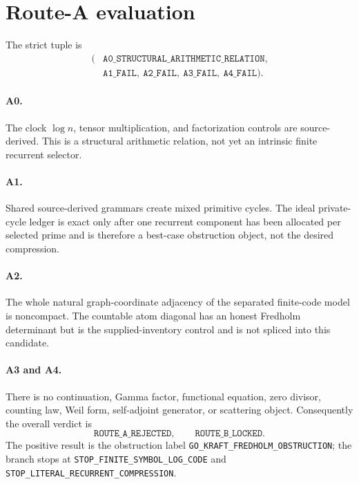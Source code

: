 \section{Route-A evaluation}

The strict tuple is
\[
\begin{aligned}
(&\texttt{A0\_STRUCTURAL\_ARITHMETIC\_RELATION},\\
 &\texttt{A1\_FAIL},\
 \texttt{A2\_FAIL},\
 \texttt{A3\_FAIL},\
 \texttt{A4\_FAIL}).
\end{aligned}
\]

\paragraph{A0.}
The clock $\log n$, tensor multiplication, and factorization controls are
source-derived.  This is a structural arithmetic relation, not yet an
intrinsic finite recurrent selector.

\paragraph{A1.}
Shared source-derived grammars create mixed primitive cycles.  The ideal
private-cycle ledger is exact only after one recurrent component has been
allocated per selected prime and is therefore a best-case obstruction
object, not the desired compression.

\paragraph{A2.}
The whole natural graph-coordinate adjacency of the separated finite-code
model is noncompact.  The countable atom diagonal has an honest Fredholm
determinant but is the supplied-inventory control and is not spliced into
this candidate.

\paragraph{A3 and A4.}
There is no continuation, Gamma factor, functional equation, zero divisor,
counting law, Weil form, self-adjoint generator, or scattering object.
Consequently the overall verdict is
\[
 \texttt{ROUTE\_A\_REJECTED},\qquad
 \texttt{ROUTE\_B\_LOCKED}.
\]
The positive result is the obstruction label
\texttt{GO\_KRAFT\_FREDHOLM\_OBSTRUCTION}; the branch stops at
\texttt{STOP\_FINITE\_SYMBOL\_LOG\_CODE} and
\texttt{STOP\_LITERAL\_RECURRENT\_COMPRESSION}.

